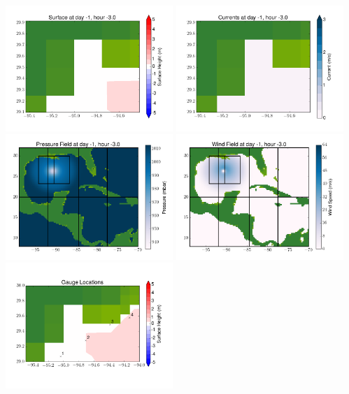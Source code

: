 \documentclass[11pt]{article}
\begin{document}
\includegraphics[width=0.475\textwidth]{frame0045fig6.png}
\vskip 10pt 
\includegraphics[width=0.475\textwidth]{frame0045fig7.png}
\includegraphics[width=0.475\textwidth]{frame0045fig8.png}
\vskip 10pt 
\includegraphics[width=0.475\textwidth]{frame0045fig9.png}
\includegraphics[width=0.475\textwidth]{frame0045fig10.png}
\end{document}
